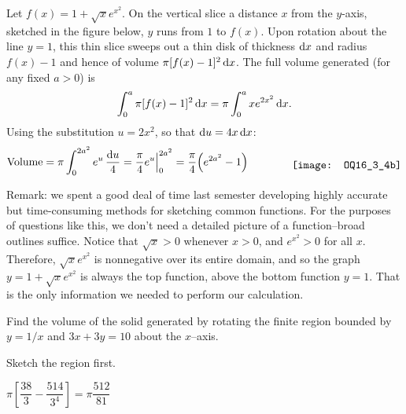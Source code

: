 \begin{solution}
Let $f(x)=1+\sqrt{x}e^{x^2}$.
On the vertical slice a distance $x$ from the $y$-axis,
sketched in the figure below, $y$ runs from $1$ to $f(x)$. Upon rotation
about the line $y=1$, this thin slice sweeps out a thin disk of thickness
$\mathrm{d}x$ and radius $f(x)-1$ and hence of volume $\pi[f(x)-1]^2\,\mathrm{d}x$.
The full volume generated (for any fixed $a>0$) is
\begin{align*}
\int_0^a\pi[f(x)-1]^2\,\mathrm{d}x
=\pi\int_0^axe^{2x^2}\,\mathrm{d}x.
\end{align*}
Using the substitution $u=2x^2$, so that $\mathrm{d}u=4x\,\mathrm{d}x$:
\begin{align*}
\text{Volume} = \pi\int_0^{2a^2}e^u\,\frac{\dee{u}}{4}
=\frac{\pi}{4}e^u\Big|_0^{2a^2}
=\frac{\pi}{4}\Big(e^{2a^2}-1\Big)
\qquad\qquad\smash{\raisebox{-0.4\height}{\texttt{[image: OQ16\_3\_4b]}}}
\end{align*}

\vspace{1cm}
Remark: we spent a good deal of time last semester developing highly accurate but time-consuming methods for sketching common functions. For the purposes of questions like this, we don't need a detailed picture of a function--broad outlines suffice. Notice that $\sqrt{x} > 0$ whenever $x>0$, and $e^{x^2}>0$ for all $x$. Therefore, $\sqrt{x}e^{x^2}$ is nonnegative over its entire domain, and so the graph $y=1+\sqrt{x}e^{x^2}$ is always the top function, above the bottom function $y=1$. That is the only information we needed to perform our calculation.
\end{solution}





\begin{question}[2014A] %
Find the volume of the solid generated by rotating the finite
region bounded by $y = 1/x$ and $3x + 3y = 10$ about the $x$--axis.
\end{question}

\begin{hint}
Sketch the region first.
\end{hint}

\begin{answer}
$\pi\left[\dfrac{38}{3}-\dfrac{514}{3^4}\right] = \pi\dfrac{512}{81}$
\end{answer}

